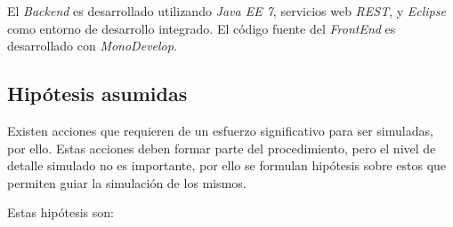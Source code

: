 El \textit{Backend} es desarrollado utilizando \textit{Java EE 7}, servicios web
\textit{REST}, y \textit{Eclipse} como entorno de desarrollo integrado. El
código fuente del \textit{FrontEnd} es desarrollado con \textit{MonoDevelop}.

\subsection{Hipótesis asumidas}

Existen acciones que requieren de un esfuerzo significativo para ser simuladas,
por ello. Estas acciones deben formar parte del procedimiento, pero el nivel de
detalle simulado no es importante, por ello se formulan hipótesis sobre estos
que permiten guiar la simulación de los mismos.

Estas hipótesis son:


